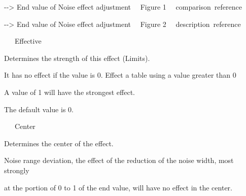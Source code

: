 \documentclass[a4paper,12pt]{article}
\begin{document}
-{-}> \textquotedbl End value of Noise effect adjustment \ \ Figure 1 \ \ comparison\textquotedbl \ reference\par
-{-}> \textquotedbl End value of Noise effect adjustment \ \ Figure 2 \ \ description\textquotedbl \ reference\\
\par
\noindent \ \ \, Effective\par
Determines the strength of this effect (Limits).\par
It has no effect if the value is 0. Effect a table using a value greater than 0\par
A value of 1 will have the strongest effect.\par
The default value is 0.\\
\par
\noindent \ \ \, Center\par
Determines the center of the effect.\par
Noise range deviation, the effect of the reduction of the noise width, most strongly\par
at the portion of 0 to 1 of the end value, will have no effect in the center.

\newpage

\thispagestyle{empty}
\end{document}
